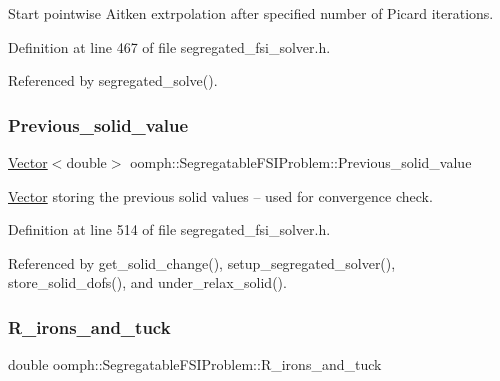 Start pointwise Aitken extrpolation after specified number of Picard iterations. 



Definition at line 467 of file segregated\+\_\+fsi\+\_\+solver.\+h.



Referenced by segregated\+\_\+solve().

\mbox{\label{classoomph_1_1SegregatableFSIProblem_a6e056ff378e38504d5e9d522820ca8cf}} 
\subsubsection{\texorpdfstring{Previous\+\_\+solid\+\_\+value}{Previous\_solid\_value}}
{\footnotesize\ttfamily \hyperlink{classoomph_1_1Vector}{Vector}$<$double$>$ oomph\+::\+Segregatable\+F\+S\+I\+Problem\+::\+Previous\+\_\+solid\+\_\+value\hspace{0.3cm}{\ttfamily [protected]}}



\hyperlink{classoomph_1_1Vector}{Vector} storing the previous solid values -- used for convergence check. 



Definition at line 514 of file segregated\+\_\+fsi\+\_\+solver.\+h.



Referenced by get\+\_\+solid\+\_\+change(), setup\+\_\+segregated\+\_\+solver(), store\+\_\+solid\+\_\+dofs(), and under\+\_\+relax\+\_\+solid().

\mbox{\label{classoomph_1_1SegregatableFSIProblem_a7568103d53df9c84b86fdf41885cf289}} 
\subsubsection{\texorpdfstring{R\+\_\+irons\+\_\+and\+\_\+tuck}{R\_irons\_and\_tuck}}
{\footnotesize\ttfamily double oomph\+::\+Segregatable\+F\+S\+I\+Problem\+::\+R\+\_\+irons\+\_\+and\+\_\+tuck\hspace{0.3cm}{\ttfamily [protected]}}



